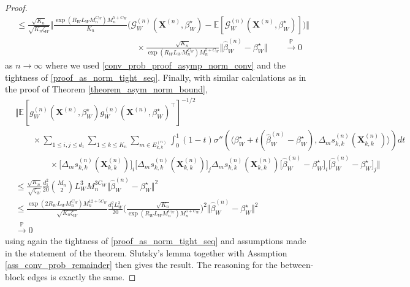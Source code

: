 \documentclass{article}
\begin{document}
\begin{proof}
\begin{align*}
    & \leq \frac{\sqrt{K_n}}{\sqrt{K_n \zeta_W}} \bigg\Vert \frac{\exp(R_WL_WM_n^{C_W}) M_n^{5+C_W}}{K_n} \big( \mathcal{G}_W^{(n)}(\mathbf{X}^{(n)},\beta_W^{\star}) - \mathbb{E}[\mathcal{G}_W^{(n)}(\mathbf{X}^{(n)},\beta_W^{\star})] \big) \bigg\Vert \\
    & \qquad \qquad \qquad \qquad \qquad \qquad \qquad \times \frac{\sqrt{K_n}}{\exp(R_WL_WM_n^{C_W}) M_n^{5+C_W}} \Vert \hat{\beta}_W^{(n)} - \beta_W^{\star} \Vert  \qquad \xrightarrow{\mathbb{P}} 0 
\end{align*}
as $n \rightarrow \infty$ where we used \eqref{conv_prob_proof_asymp_norm_conv} and the tightness of \eqref{proof_as_norm_tight_seq}. Finally, with similar calculations as in the proof of Theorem \ref{theorem_asym_norm_bound},
\begin{align*}
    &\bigg\Vert \mathbb{E}[g_W^{(n)}(\mathbf{X}^{(n)},\beta_W^{\star})g_W^{(n)}(\mathbf{X}^{(n)},\beta_W^{\star})^{\top}]^{-1/2} \\
    & \qquad \times \sum_{1 \leq i,j \leq d_1} \sum_{1\leq k \leq K_n} \sum_{m \in E_{k,k}^{(n)}} \int_0^1 (1-t) \sigma'' ( \langle \beta_W^{\star} + t(\hat{\beta}_W^{(n)} - \beta_W^{\star}) , \Delta_m s_{k,k}^{(n)}(\mathbf{X}_{k,k}^{(n)}) \rangle )dt  \\
    & \qquad \qquad \times \big[\Delta_m s_{k,k}^{(n)}(\mathbf{X}_{k,k}^{(n)}) \big]_i \big[\Delta_m s_{k,k}^{(n)}(\mathbf{X}_{k,k}^{(n)}) \big]_j \Delta_m s_{k,k}^{(n)}(\mathbf{X}_{k,k}^{(n)})  \big[ \hat{\beta}_W^{(n)}-\beta_W^{\star}\big]_i \big[ \hat{\beta}_W^{(n)}-\beta_W^{\star}\big]_j \bigg\Vert \\
    &\leq  \frac{\sqrt{K_n}}{\sqrt{ \zeta_W}} \frac{d_1^2}{20} \binom{M_n}{2}  L_W^3 M_n^{3C_W}  \Vert \hat{\beta}_W^{(n)}-\beta_W^{\star}\Vert^2 \\
    & \leq  \frac{\exp(2R_WL_WM_n^{C_W}) M_n^{12+5C_W}}{\sqrt{ K_n \zeta_W}} \frac{d_1^2 L_W^3 }{20} \bigg(\frac{\sqrt{K_n}}{\exp(R_WL_WM_n^{C_W}) M_n^{5+C_W}} \bigg)^2  \Vert \hat{\beta}_W^{(n)}-\beta_W^{\star}\Vert^2  \\
    & \xrightarrow{\mathbb{P}} 0 
\end{align*}
using again the tightness of \eqref{proof_as_norm_tight_seq} and assumptions made in the statement of the theorem. Slutsky's lemma together with Assmption \ref{ass_conv_prob_remainder} then gives the result. The reasoning for the between-block edges is exactly the same.
\end{proof}
\end{document}
